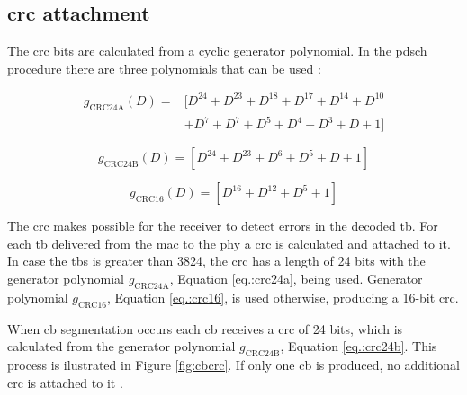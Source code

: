 \subsection{\gls{crc} attachment}

The \gls{crc} bits are calculated from a cyclic generator polynomial.
%
In the \gls{pdsch} procedure there are three polynomials that can be used \cite{3gpp.38.212}:

\begin{equation} \label{eq.:crc24a}
    \begin{split}
        g_{\mathrm{CRC24A}}(D) = & [ D^{24} + D^{23} + D^{18} + D^{17} +  D^{14} + D^{10} \\ & + D^{7} + D^{7} + D^{5} + D^{4} + D^{3} + D + 1 ]
    \end{split}
\end{equation}

\begin{equation}\label{eq.:crc24b}
    g_{\mathrm{CRC24B}}(D) = \left[ D^{24} + D^{23} + D^{6} + D^{5} + D + 1 \right]
\end{equation}

\begin{equation} \label{eq.:crc16}
    g_{\mathrm{CRC16}}(D) = \left[ D^{16} + D^{12} + D^{5} + 1 \right]
\end{equation}


The \gls{crc} makes possible for the receiver to detect errors in the decoded \gls{tb}.
%
For each \gls{tb} delivered from the \gls{mac} to the \gls{phy} a \gls{crc} is calculated and attached to it.
%
In case the \gls{tbs} is greater than 3824, the \gls{crc} has a length of 24 bits with the generator polynomial $g_{\mathrm{CRC24A}}$, Equation \eqref{eq.:crc24a}, being used.
%
Generator polynomial $g_{\mathrm{CRC16}}$, Equation \eqref{eq.:crc16}, is used otherwise, producing a 16-bit \gls{crc}.

When \gls{cb} segmentation occurs each \gls{cb} receives a \gls{crc} of 24 bits, which is calculated from the generator polynomial $g_{\mathrm{CRC24B}}$, Equation \eqref{eq.:crc24b}.
%
This process is ilustrated in Figure \ref{fig:cbcrc}.
%
If only one \gls{cb} is produced, no additional \gls{crc} is attached to it \cite{ErikDahlman5G}.


